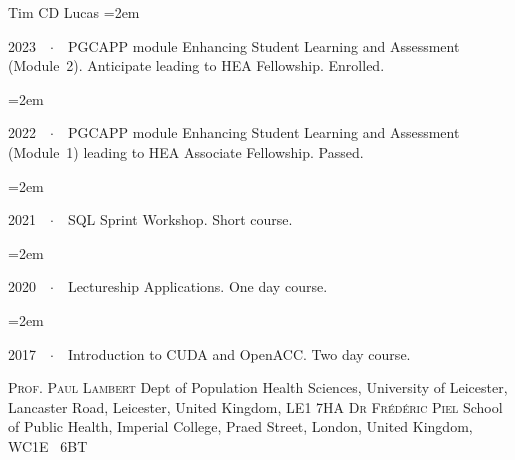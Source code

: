\documentclass{scrartcl}
\newcommand{\Description}[1]{\hangindent=2em\hangafter=0\noindent\raggedright\footnotesize{#1}\par\normalsize\vspace{1em}} %
\begin{document}
\begin{cv}{Tim {\Large CD} Lucas}
\Description{2023\ \ $\cdotp$\ \ {\scriptsize PGCAPP} module Enhancing Student Learning and Assessment (Module~2). Anticipate leading to HEA Fellowship. Enrolled.}
\vspace{-0.5em} %
\Description{2022\ \ $\cdotp$\ \ {\scriptsize PGCAPP} module Enhancing Student Learning and Assessment (Module~1) leading to HEA Associate Fellowship. Passed.}
\vspace{-0.5em} %
\Description{2021\ \ $\cdotp$\ \ {\scriptsize SQL} Sprint Workshop. Short course.}
\vspace{-0.5em} %
\Description{2020\ \ $\cdotp$\ \ Lectureship Applications. One day course.}
\vspace{-0.5em} %
\Description{2017\ \ $\cdotp$\ \ Introduction to CUDA and OpenACC. Two day course.}
\vspace{-0.5em} %

\vspace{1em} %

{\color{Maroon}}\vspace{-1em}

\begin{multicols}{2}
\begin{footnotesize}
\textsc{Prof. Paul Lambert}\newline
Dept of Population Health Sciences,
\newline
University of Leicester,\newline
Lancaster Road,\newline
Leicester,\newline
United Kingdom,\newline
{\scriptsize LE}1 7{\scriptsize HA}
\vfill
\columnbreak
\textsc{Dr Fr\'{e}d\'{e}ric Piel}\newline
School of Public Health,\newline
Imperial College,\newline
Praed Street,\newline
London,\newline
United Kingdom,\newline
{\scriptsize WC}1{\scriptsize E} \ 6{\scriptsize BT}




\end{footnotesize}
\end{multicols}
\end{cv}
\end{document}
